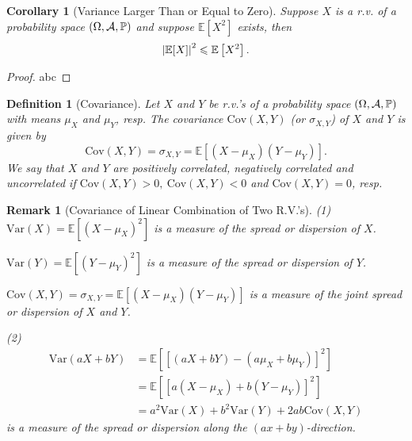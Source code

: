 \documentclass[openany,12pt]{book}
\newtheorem{corollary}{Corollary}[chapter]
\newtheorem{remark}{Remark}[chapter]
\newtheorem{definition}{Definition}[chapter]
\begin{document}
\begin{corollary}[Variance Larger Than or Equal to Zero]
Suppose $X$ is a r.v. of a probability space $(\Omega,\mathcal{A},\mathbb{P})$ and suppose
$\mathbb{E}[ X^{2}]$ exists, then
\[\left| \mathbb{E}[X] \right|^{2} \leqslant \mathbb{E}\left[ X^{2} \right].\]
\end{corollary}

\begin{proof}
  abc
\end{proof}

\begin{definition}[Covariance]
Let $X$ and $Y$ be r.v.'s of a probability space $(\Omega,\mathcal{A},\mathbb{P})$ with means $\mu_{X}$ and $\mu_{Y}$, resp. The covariance $\mathrm{Cov}(X,Y)$ (or $\sigma_{X,Y}$) of $X$ and $Y$ is given by
\[\mathrm{Cov}(X,Y) = \sigma_{X,Y} = \mathbb{E}\left[ \left( X - \mu_{X} \right)\left( Y - \mu_{Y} \right) \right].\]
We say that $X$ and $Y$ are positively correlated, negatively correlated and uncorrelated if
$\mathrm{Cov}(X,Y) > 0,\ \mathrm{Cov}(X,Y) < 0$ and
$\mathrm{Cov}(X,Y) = 0$, resp.
\end{definition}

\begin{remark}[Covariance of Linear Combination of Two R.V.'s]
(1)
$\mathrm{Var}(X) = \mathbb{E}[(X-\mu_{X})^{2}]$ is a measure of the spread or dispersion of $X$.

$\mathrm{Var}(Y) = \mathbb{E}[(Y-\mu_{Y})^{2}]$ is a measure of the spread or dispersion of $Y$.

$\mathrm{Cov}(X,Y) = \sigma_{X,Y} = \mathbb{E}[( X - \mu_{X})(Y-\mu_{Y})]$ is a measure of the joint spread or dispersion of $X$ and $Y$.

(2)
\[\begin{aligned}
\mathrm{Var}(aX + bY) &= \mathbb{E}[ [ ( aX + bY ) - ( a\mu_{X} + b\mu_{Y} ) ]^{2} ]\\
&= \mathbb{E}[[ a( X - \mu_{X} ) + b( Y - \mu_{Y} ) ]^{2}]\\
& = a^{2}\mathrm{Var}(X) + b^{2}\mathrm{Var}(Y) + 2ab\mathrm{Cov}(X,Y)
\end{aligned}\]
is a measure of the spread or dispersion along the $(ax + by)$-direction.

\end{remark}
\end{document}

